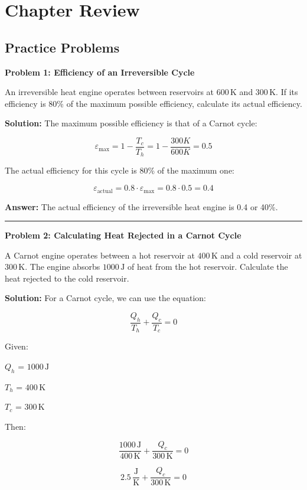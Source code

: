 \documentclass[
  9pt,
]{extbook}
\theoremstyle{definition}
\theoremstyle{definition}
\theoremstyle{definition}
\theoremstyle{definition}
\theoremstyle{remark}
\begin{document}
\section{Chapter Review}\label{rev6}

\subsection{Practice Problems}\label{exer6}

\textbf{Problem 1: Efficiency of an Irreversible Cycle}

An irreversible heat engine operates between reservoirs at \(600\,\text{K}\) and \(300\,\text{K}\). If its efficiency is 80\% of the maximum possible efficiency, calculate its actual efficiency.

\textbf{Solution:} The maximum possible efficiency is that of a Carnot cycle:

\[\varepsilon_{\text{max}} = 1 - \frac{T_c}{T_h} = 1 - \frac{300 K}{600 K} = 0.5\]

The actual efficiency for this cycle is 80\% of the maximum one:

\[\varepsilon_{\text{actual}} = 0.8 \cdot \varepsilon_{\text{max}} = 0.8 \cdot 0.5 = 0.4\]

\textbf{Answer:} The actual efficiency of the irreversible heat engine is 0.4 or 40\%.

\begin{center}\rule{0.5\linewidth}{0.5pt}\end{center}

\textbf{Problem 2: Calculating Heat Rejected in a Carnot Cycle}

A Carnot engine operates between a hot reservoir at \(400\,\text{K}\) and a cold reservoir at \(300\,\text{K}\). The engine absorbs \(1000\,\text{J}\) of heat from the hot reservoir. Calculate the heat rejected to the cold reservoir.

\textbf{Solution:} For a Carnot cycle, we can use the equation:

\[\frac{Q_h}{T_h} + \frac{Q_c}{T_c} = 0\]

Given:

\(Q_h\) = \(1000\,\text{J}\)

\(T_h\) = \(400\,\text{K}\)

\(T_c\) = \(300\,\text{K}\)

Then:

\[\frac{1000\,\text{J}}{400\,\text{K}} + \frac{Q_c}{300\,\text{K}} = 0\]

\[2.5\,\frac{\text{J}}{\text{K}} + \frac{Q_c}{300\,\text{K}} = 0\]
\end{document}
